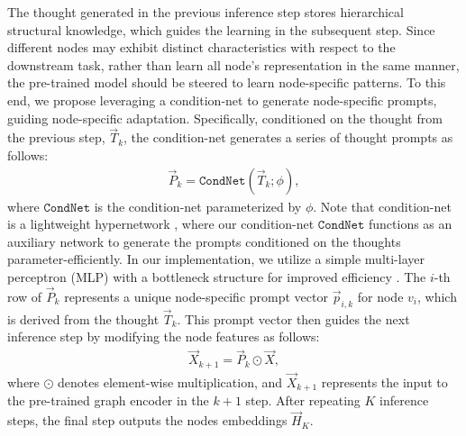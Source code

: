 The thought generated in the previous inference step stores hierarchical structural knowledge, which guides the learning in the subsequent step. Since different nodes may exhibit distinct characteristics with respect to the downstream task, rather than learn all node's representation in the same manner, the pre-trained model should be steered to learn node-specific patterns. To this end, we propose leveraging a condition-net \cite{zhou2022conditional,yu2024dygprompt,yu2024non} to generate node-specific prompts, guiding node-specific adaptation. Specifically, conditioned on the thought from the previous step, \(\vec{T}_{k}\), the condition-net generates a series of thought prompts as follows:
\begin{align}\label{eq.prompt-generation}
    \vec{P}_{k} = \mathtt{CondNet}(\vec{T}_{k}; \phi),
\end{align}
where \(\mathtt{CondNet}\) is the condition-net parameterized by \(\phi\). Note that condition-net is a lightweight hypernetwork \cite{ha2022hypernetworks}, where our condition-net $\mathtt{CondNet}$ functions as an auxiliary network to generate the prompts conditioned on the thoughts parameter-efficiently. In our implementation, we utilize a simple multi-layer perceptron (MLP) with a bottleneck structure for improved efficiency \cite{wu2018reducing}.
The $i$-th row of \(\vec{P}_{k}\) represents a unique node-specific prompt vector \( \vec{p}_{i,k} \) for node $v_i$, which is derived from the thought \(\vec{T}_{k}\). This prompt vector then guides the next inference step by modifying the node features as follows:
\begin{align}\label{eq.thought-prompting}
    \vec{X}_{k+1} = \vec{P}_k \odot \vec{X},
\end{align}
where \(\odot\) denotes element-wise multiplication, and \(\vec{X}_{k+1}\) represents the input to the pre-trained graph encoder in the \(k+1\) step. After repeating \(K\) inference steps, the final step outputs the nodes embeddings \(\vec{H}_{K}\).


